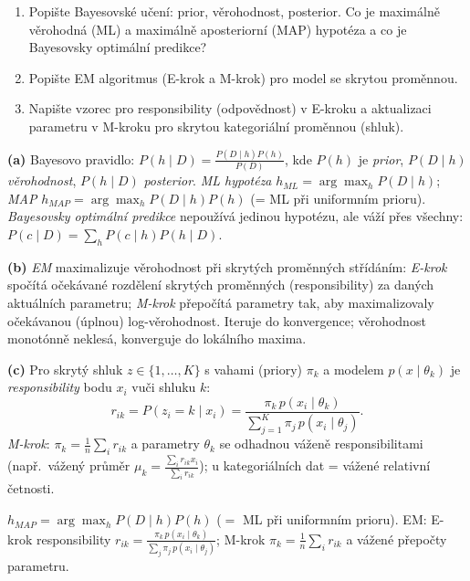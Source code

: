 \begin{zadani}
\begin{enumerate}[label=(\alph*)]
  \item {} Popište Bayesovské učení: prior, věrohodnost, posterior. Co je maximálně věrohodná (ML) a maximálně aposteriorní (MAP) hypotéza a co je Bayesovsky optimální predikce?
  \item {} Popište EM algoritmus (E-krok a M-krok) pro model se skrytou proměnnou.
  \item {} Napište vzorec pro responsibility (odpovědnost) v E-kroku a aktualizaci parametru v M-kroku pro skrytou kategoriální proměnnou (shluk).
\end{enumerate}
\end{zadani}

\begin{reseni}
\textbf{(a)} Bayesovo pravidlo: $P(h\mid D)=\frac{P(D\mid h)P(h)}{P(D)}$, kde $P(h)$ je \emph{prior}, $P(D\mid h)$ \emph{věrohodnost}, $P(h\mid D)$ \emph{posterior}. \emph{ML hypotéza} $h_{ML}=\arg\max_h P(D\mid h)$; \emph{MAP} $h_{MAP}=\arg\max_h P(D\mid h)P(h)$ (= ML při uniformním prioru). \emph{Bayesovsky optimální predikce} nepoužívá jedinou hypotézu, ale váží přes všechny: $P(c\mid D)=\sum_h P(c\mid h)P(h\mid D)$.

\textbf{(b)} \emph{EM} maximalizuje věrohodnost při skrytých proměnných střídáním: \emph{E-krok} spočítá očekávané rozdělení skrytých proměnných (responsibility) za daných aktuálních parametru; \emph{M-krok} přepočítá parametry tak, aby maximalizovaly očekávanou (úplnou) log-věrohodnost. Iteruje do konvergence; věrohodnost monotónně neklesá, konverguje do lokálního maxima.

\textbf{(c)} Pro skrytý shluk $z\in\{1,\dots,K\}$ s vahami (priory) $\pi_k$ a modelem $p(x\mid\theta_k)$ je \emph{responsibility} bodu $x_i$ vuči shluku $k$:
\[
r_{ik}=P(z_i=k\mid x_i)=\frac{\pi_k\,p(x_i\mid\theta_k)}{\sum_{j=1}^K \pi_j\,p(x_i\mid\theta_j)}.
\]
\emph{M-krok}: $\pi_k=\frac1n\sum_i r_{ik}$ a parametry $\theta_k$ se odhadnou váženě responsibilitami (např.\ vážený průměr $\mu_k=\frac{\sum_i r_{ik}x_i}{\sum_i r_{ik}}$); u kategoriálních dat = vážené relativní četnosti.
\end{reseni}

\begin{jadro}
$h_{MAP}=\arg\max_h P(D\mid h)P(h)$ ($=$ ML při uniformním prioru). EM: E-krok responsibility $r_{ik}=\frac{\pi_k\,p(x_i\mid\theta_k)}{\sum_j\pi_j\,p(x_i\mid\theta_j)}$; M-krok $\pi_k=\frac1n\sum_i r_{ik}$ a vážené přepočty parametru.
\end{jadro}

